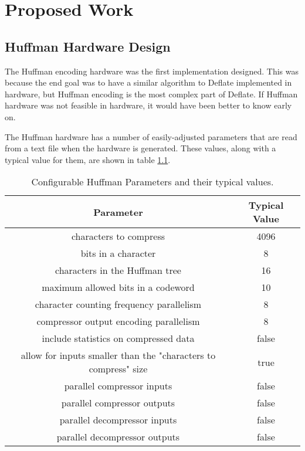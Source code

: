 \documentclass[doublespace,draft,nopageskip]{VTthesis} %
\begin{document}
\chapter{Proposed Work} \label{ch:proposed_work}
\section{Huffman Hardware Design}\label{se:huffman_hardware_design}
The Huffman encoding hardware was the first implementation designed. This was because the end goal was to have a similar algorithm to Deflate implemented in hardware, but Huffman encoding is the most complex part of Deflate. If Huffman hardware was not feasible in hardware, it would have been better to know early on.

The Huffman hardware has a number of easily-adjusted parameters that are read from a text file when the hardware is generated. These values, along with a typical value for them, are shown in table \ref{tab:huffman-configuration-table}.

\begin{table}[htb]
	\centering
	\caption{Configurable Huffman Parameters and their typical values.}
	\begin{tabular}{|c|c|}
	    \hline
	    Parameter & Typical Value \\
	    \hline
	    characters to compress & 4096 \\
	    \hline
	    bits in a character & 8 \\
	    \hline
	    characters in the Huffman tree & 16 \\
	    \hline
	    maximum allowed bits in a codeword & 10 \\
	    \hline
	    character counting frequency parallelism & 8 \\
	    \hline
	    compressor output encoding parallelism & 8 \\
	    \hline
	    include statistics on compressed data & false \\
	    \hline
	    allow for inputs smaller than the "characters to compress" size & true \\
	    \hline
	    parallel compressor inputs & false \\
	    \hline
	    parallel compressor outputs & false \\
	    \hline
	    parallel decompressor inputs & false \\ 
	    \hline
	    parallel decompressor outputs & false \\
	    \hline
	\end{tabular}
	\label{tab:huffman-configuration-table}
\end{table}
\end{document}
